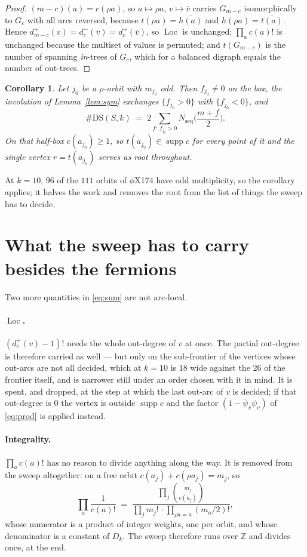 \documentclass[11pt]{article}
\theoremstyle{plain}
\newtheorem{corollary}[theorem]{Corollary}
\theoremstyle{definition}
\theoremstyle{remark}
\newcommand{\Z}{\mathbb{Z}}
\newcommand{\supp}{\operatorname{supp}}
\newcommand{\Loc}{\operatorname{Loc}}
\newcommand{\Nseq}{N_{\mathrm{seq}}}
\newcommand{\DS}{\mathrm{DS}}
\newcommand{\bpsi}{\bar\psi}
\begin{document}
\begin{proof}
$(m-c)(a)=c(\rho a)$, so $a\mapsto\rho a$, $v\mapsto\bar v$ carries $G_{m-c}$ isomorphically to
$G_c$ with all arcs reversed, because $t(\rho a)=\overline{h(a)}$ and $h(\rho a)=\overline{t(a)}$.
Hence $d^+_{m-c}(v)=d^-_c(\bar v)=d^+_c(\bar v)$, so $\Loc$ is unchanged; $\prod_ac(a)!$ is
unchanged because the multiset of values is permuted; and $t(G_{m-c})$ is the number of spanning
\emph{in}-trees of $G_c$, which for a balanced digraph equals the number of out-trees.
\end{proof}

\begin{corollary}\label{cor:half}
Let $j_0$ be a $\rho$-orbit with $m_{j_0}$ odd. Then $f_{j_0}\ne0$ on the box, the involution of
Lemma~\ref{lem:sym} exchanges $\{f_{j_0}>0\}$ with $\{f_{j_0}<0\}$, and
\[
\#\DS(S,k)\;=\;2\!\!\sum_{f:\ f_{j_0}>0}\!\!\Nseq\Big(\frac{m+f}{2}\Big).
\]
On that half-box $c(a_{j_0})\ge1$, so $t(a_{j_0})\in\supp c$ for every point of it and the
single vertex $r=t(a_{j_0})$ serves as root throughout.
\end{corollary}

At $k=10$, $96$ of the $111$ orbits of $\phi$X174 have odd multiplicity, so the corollary
applies; it halves the work and removes the root from the list of things the sweep has to
decide.

\section{What the sweep has to carry besides the fermions}\label{sec:carry}

Two more quantities in \eqref{eq:sum} are not arc-local.

\paragraph{$\Loc$.} $(d^+_c(v)-1)!$ needs the whole out-degree of $v$ at once. The partial
out-degree is therefore carried as well --- but only on the sub-frontier of the vertices whose
out-arcs are not all decided, which at $k=10$ is $18$ wide against the $26$ of the frontier
itself, and is narrower still under an order chosen with it in mind. It is spent, and dropped,
at the step at which the last out-arc of $v$ is decided; if that out-degree is $0$ the vertex is
outside $\supp c$ and the factor $(1-\bpsi_v\psi_v)$ of \eqref{eq:prod} is applied instead.

\paragraph{Integrality.} $\prod_ac(a)!$ has no reason to divide anything along the way. It is
removed from the sweep altogether: on a free orbit $c(a_j)+c(\rho a_j)=m_j$, so
\begin{equation}\label{eq:int}
\prod_{a}\frac1{c(a)!}\;=\;\frac{\prod_j\binom{m_j}{c(a_j)}}{\prod_j m_j!\,\cdot
\prod_{\rho a=a}(m_a/2)!},
\end{equation}
whose numerator is a product of integer weights, one per orbit, and whose denominator is a
constant of $D_k$. The sweep therefore runs over $\Z$ and divides once, at the end.
\end{document}
